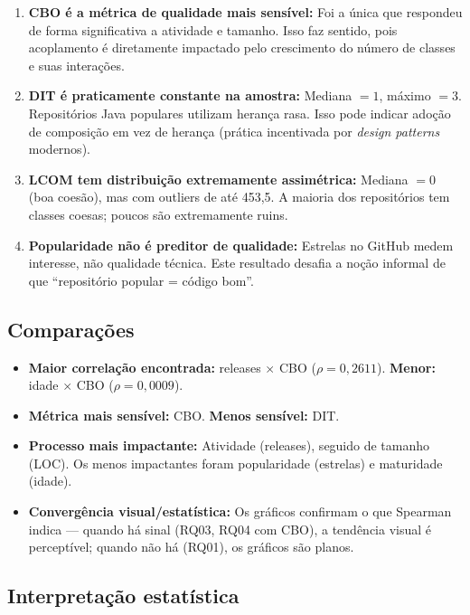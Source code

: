 \documentclass[12pt,a4paper]{article}
\begin{document}
\begin{enumerate}
    \item \textbf{CBO é a métrica de qualidade mais sensível:} Foi a única que respondeu de forma significativa a atividade e tamanho. Isso faz sentido, pois acoplamento é diretamente impactado pelo crescimento do número de classes e suas interações.

    \item \textbf{DIT é praticamente constante na amostra:} Mediana $= 1$, máximo $= 3$. Repositórios Java populares utilizam herança rasa. Isso pode indicar adoção de composição em vez de herança (prática incentivada por \textit{design patterns} modernos).

    \item \textbf{LCOM tem distribuição extremamente assimétrica:} Mediana $= 0$ (boa coesão), mas com outliers de até 453,5. A maioria dos repositórios tem classes coesas; poucos são extremamente ruins.

    \item \textbf{Popularidade não é preditor de qualidade:} Estrelas no GitHub medem interesse, não qualidade técnica. Este resultado desafia a noção informal de que ``repositório popular = código bom''.
\end{enumerate}

\subsection{Comparações}

\begin{itemize}
    \item \textbf{Maior correlação encontrada:} releases $\times$ CBO ($\rho = 0{,}2611$). \textbf{Menor:} idade $\times$ CBO ($\rho = 0{,}0009$).
    \item \textbf{Métrica mais sensível:} CBO. \textbf{Menos sensível:} DIT.
    \item \textbf{Processo mais impactante:} Atividade (releases), seguido de tamanho (LOC). Os menos impactantes foram popularidade (estrelas) e maturidade (idade).
    \item \textbf{Convergência visual/estatística:} Os gráficos confirmam o que Spearman indica — quando há sinal (RQ03, RQ04 com CBO), a tendência visual é perceptível; quando não há (RQ01), os gráficos são planos.
\end{itemize}

\subsection{Interpretação estatística}
\end{document}
